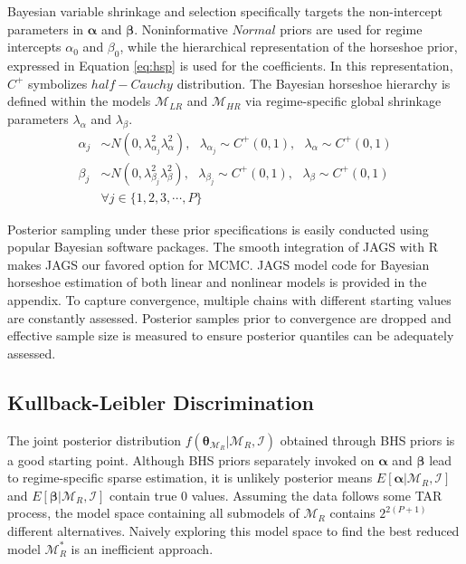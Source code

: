 Bayesian variable shrinkage and selection specifically targets the non-intercept parameters in $\bm{\alpha}$ and $\bm{\beta}$. Noninformative $Normal$ priors are used for regime intercepts $\alpha_0$ and $\beta_0$, while the hierarchical representation of the horseshoe prior, expressed in Equation \ref{eq:hsp} is used for the coefficients. In this representation, $C^+$ symbolizes $half-Cauchy$ distribution. The Bayesian horseshoe hierarchy is defined within the models $\mathcal{M}_{LR}$ and $\mathcal{M}_{HR}$ via  regime-specific global shrinkage parameters $\lambda_\alpha$ and $\lambda_\beta$. 
\begin{equation}
\label{eq:hsp}
\begin{split}
 	\alpha_j &\sim N(0,\lambda^2_{\alpha_j}\lambda_{\alpha}^2), \textrm{ } \lambda_{\alpha_j}\sim C^+(0,1), \textrm{ } \lambda_\alpha \sim C^+(0,1) \\
 	\beta_j & \sim N(0,\lambda^2_{\beta_j}\lambda_{\beta}^2), \textrm{ } \lambda_{\beta_j}\sim C^+(0,1), \textrm{ } \lambda_\beta \sim C^+(0,1)\\
 	& \forall j \in \{1,2,3,\cdots,P\}
\end{split}
\end{equation}

Posterior sampling under these prior specifications is easily conducted using popular Bayesian software packages. The smooth integration of JAGS \cite{Plummer2003} with R makes JAGS our favored option for MCMC. JAGS model code for Bayesian horseshoe estimation of both linear and nonlinear models is provided in the appendix. To capture convergence, multiple chains with different starting values are constantly assessed. Posterior samples prior to convergence are dropped and effective sample size is measured to ensure posterior quantiles can be adequately assessed.

\subsection{Kullback-Leibler Discrimination}
The joint posterior distribution $f(\bm{\theta}_{\mathcal{M}_R}|\mathcal{M}_R,\mathcal{I})$ obtained through BHS priors is  a good starting point. Although BHS priors separately invoked on $\bm{\alpha}$ and $\bm{\beta}$ lead to regime-specific sparse estimation, it is unlikely posterior means $E[\bm{\alpha}|\mathcal{M}_R,\mathcal{I}]$ and $E[\bm{\beta}|\mathcal{M}_R,\mathcal{I}]$ contain true $0$ values.   Assuming the data follows some TAR process, the model space containing all submodels of $\mathcal{M}_R$ contains $2^{2(P+1)}$ different alternatives. Naively exploring this model space to find the best reduced model $\mathcal{M}^*_R$ is an inefficient approach.

